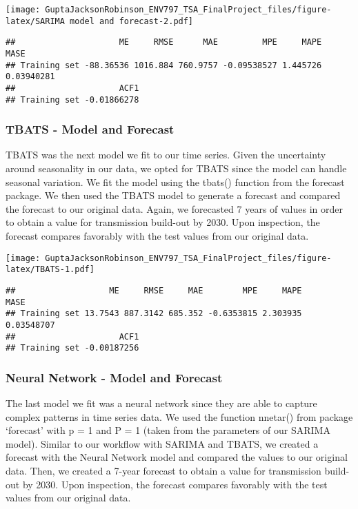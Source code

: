 \documentclass[
]{article}
\begin{document}
\texttt{[image: GuptaJacksonRobinson\_ENV797\_TSA\_FinalProject\_files/figure-latex/SARIMA model and forecast-2.pdf]}

\begin{verbatim}
##                     ME     RMSE      MAE         MPE     MAPE       MASE
## Training set -88.36536 1016.884 760.9757 -0.09538527 1.445726 0.03940281
##                     ACF1
## Training set -0.01866278
\end{verbatim}

\hypertarget{tbats---model-and-forecast}{%
\subsubsection{TBATS - Model and
Forecast}\label{tbats---model-and-forecast}}

TBATS was the next model we fit to our time series. Given the
uncertainty around seasonality in our data, we opted for TBATS since the
model can handle seasonal variation. We fit the model using the tbats()
function from the forecast package. We then used the TBATS model to
generate a forecast and compared the forecast to our original data.
Again, we forecasted 7 years of values in order to obtain a value for
transmission build-out by 2030. Upon inspection, the forecast compares
favorably with the test values from our original data.

\texttt{[image: GuptaJacksonRobinson\_ENV797\_TSA\_FinalProject\_files/figure-latex/TBATS-1.pdf]}

\begin{verbatim}
##                   ME     RMSE     MAE        MPE     MAPE       MASE
## Training set 13.7543 887.3142 685.352 -0.6353815 2.303935 0.03548707
##                     ACF1
## Training set -0.00187256
\end{verbatim}

\hypertarget{neural-network---model-and-forecast}{%
\subsubsection{Neural Network - Model and
Forecast}\label{neural-network---model-and-forecast}}

The last model we fit was a neural network since they are able to
capture complex patterns in time series data. We used the function
nnetar() from package `forecast' with p = 1 and P = 1 (taken from the
parameters of our SARIMA model). Similar to our workflow with SARIMA and
TBATS, we created a forecast with the Neural Network model and compared
the values to our original data. Then, we created a 7-year forecast to
obtain a value for transmission build-out by 2030. Upon inspection, the
forecast compares favorably with the test values from our original data.
\end{document}
